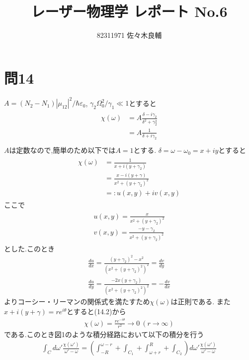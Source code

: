 \documentclass[uplatex,a4j,11pt,dvipdfmx]{jsarticle}
\begin{document}
\title{レーザー物理学 レポート No.6}
\author{82311971 佐々木良輔}
\date{}
\maketitle
\section*{問14}
\setcounter{section}{14}
\setcounter{equation}{0}
$A=(N_2-N_1)|\mu_{12}|^2/\hbar\varepsilon_0$, $\gamma_2\Omega_0^2/\gamma_1\ll 1$とすると
\begin{align}
  \begin{split}
    \chi(\omega)&=A\frac{\delta-i\gamma_2}{\delta^2+\gamma_2^2}\\
    &=A\frac{1}{\delta+i\gamma_2}\\
  \end{split}
\end{align}
$A$は定数なので,簡単のため以下では$A=1$とする.
$\delta=\omega-\omega_0=x+iy$とすると
\begin{align}
  \begin{split}
    \chi(\omega)&=\frac{1}{x+i(y+\gamma_2)}\\
    &=\frac{x-i(y+\gamma)}{x^2+(y+\gamma_2)^2}\\
    &=:u(x,y)+iv(x,y)
  \end{split}
\end{align}
ここで
\begin{align}
  \begin{split}
    u(x,y)=\frac{x}{x^2+(y+\gamma_2)^2}\\
    v(x,y)=\frac{-y-\gamma_2}{x^2+(y+\gamma_2)^2}
  \end{split}
\end{align}
とした.このとき
\begin{align}
  \frac{du}{dx}=\frac{(y+\gamma_2)^2-x^2}{\left(x^2+(y+\gamma_2)^2\right)^2}=\frac{dv}{dy}\\
  \frac{du}{dy}=\frac{-2x(y+\gamma_2)}{\left(x^2+(y+\gamma_2)^2\right)^2}=-\frac{dv}{dx}
\end{align}
よりコーシー・リーマンの関係式を満たすため$\chi(\omega)$は正則である.
また$x+i(y+\gamma)=re^{i\theta}$とすると(14.2)から
\begin{align}
  \chi(\omega)=\frac{re^{-i\theta}}{r^2}\rightarrow 0\ (r\rightarrow\infty)
\end{align}
である.このとき図1のような積分経路において以下の積分を行う
\begin{align}
  \int_Cd\omega'\frac{\chi(\omega')}{\omega'-\omega}=\left(\int_{-R}^{\omega-r}+\int_{C_1}+\int_{\omega+r}^{R}+\int_{C_2}\right)d\omega'\frac{\chi(\omega')}{\omega'-\omega}
\end{align}
\end{document}

